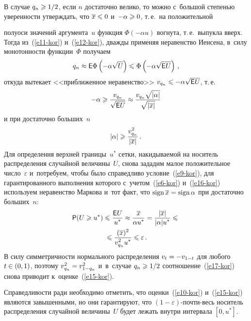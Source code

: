 \begin{multicols}{2}
В случае $q_n\hm\geqslant1/2$, если $n$ достаточно велико, то можно
с~большой степенью уверенности утверж\-дать, что $\overline x\hm\leqslant 0$
и~$-\alpha\hm\geqslant 0$, т.\,е.\ на положительной\linebreak\vspace*{-12pt}

\pagebreak




\noindent
 полуоси значений аргумента~$u$
функция $\Phi(-\alpha u)$ вогнута, т.\,е.\ выпукла вверх. Тогда
из~(\ref{e11-kor}) и~(\ref{e12-kor}), дважды применяя неравенство Иенсена, в~силу
монотонности функции~$\Phi$ получаем
$$
q_n\approx {\sf E}\Phi\left(-\alpha\sqrt{U}\right)\leqslant
\Phi\left(-\alpha\sqrt{{\sf E}U}\right)\,,
$$
откуда вытекает <<приближенное неравенство>> $v_{q_n}\hm \leqslant
-\alpha\sqrt{{\sf E}U}$,
т.\,е.
$$
-\alpha\geqslant\displaystyle\frac{\displaystyle v_{q_n}\mathstrut}{\displaystyle \sqrt{{\sf E}U}\mathstrut}\approx
\displaystyle\frac{\displaystyle v_{q_n}\sqrt{|\alpha|}\mathstrut}{\displaystyle \sqrt{|\overline x|}\mathstrut}
$$
и при достаточно больших~$n$
\begin{equation}
|\alpha|\geqslant\displaystyle\frac{\displaystyle v_{q_n}^2\mathstrut}{\displaystyle |\overline x|\mathstrut}\,.\label{e16-kor}
\end{equation}
Для определения верхней границы~$u^*$ сетки, накидываемой на
носитель распределения случайной величины~$U$, снова зададим малое
положительное число~$\varepsilon$ и~потребуем, чтобы было
справедливо условие~(\ref{e9-kor}), для гарантированного выполнения которого
с~учетом~(\ref{e6-kor}) и~(\ref{e16-kor}) используем неравенство Маркова и~тот факт, что
$\mathrm{sign}\, \overline x\hm=\mathrm{sign}\,\alpha$ при достаточно
больших~$n$:
\begin{multline}
{\sf P}(U\geqslant u^*)\leqslant \displaystyle\frac{\displaystyle {\sf E}U\mathstrut}{\displaystyle u^*\mathstrut}\approx
\displaystyle\frac{\displaystyle \overline x\mathstrut}{\displaystyle \alpha u^*\mathstrut}=
\displaystyle\frac{\displaystyle |\overline x|\mathstrut}{\displaystyle |\alpha| u^*\mathstrut} \leqslant{}\\
{}\leqslant
\displaystyle\frac{\displaystyle (\overline x)^2\mathstrut}{\displaystyle v_{q_n}^2 u^*\mathstrut}\leqslant
\varepsilon\,.\label{e17-kor}
\end{multline}
В силу симметричности нормального распределения $v_{t}\hm=-v_{1-t}$ для
любого $t\hm\in(0,1)$, поэтому $v_{q_n}^2\hm=v_{1-q_n}^2$ и~в~случае
$q_n\hm\geqslant1/2$ соотношение~(\ref{e17-kor}) снова приводит к~оценке~(\ref{e15-kor}).

Справедливости ради необходимо отметить, что оценки~(\ref{e10-kor}) и~(\ref{e15-kor})
являются завышенными, но они гарантируют, что
$(1-\varepsilon)$-почти-весь носитель распределения случайной
величины~$U$ будет лежать внутри интервала $[0, u^*]$.


\end{multicols}
